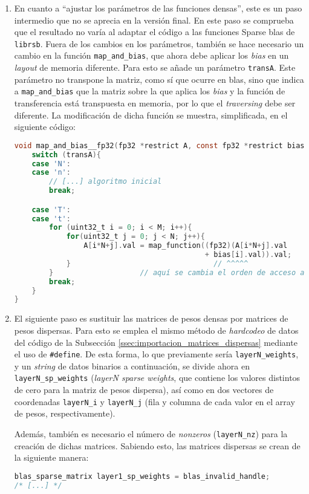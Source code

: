 \begin{enumerate}
    \item En cuanto a ``ajustar los parámetros de las funciones densas'', este es un paso intermedio que no se aprecia en la versión final. En este paso se comprueba que el resultado no varía al adaptar el código a las funciones Sparse \acrshort{blas} de \texttt{librsb}. Fuera de los cambios en los parámetros, también se hace necesario un cambio en la función \texttt{map\_and\_bias}, que ahora debe aplicar los \textit{bias} en un \textit{layout} de memoria diferente. Para esto se añade un parámetro \texttt{transA}. Este parámetro no transpone la matriz, como sí que ocurre en \acrshort{blas}, sino que indica a \texttt{map\_and\_bias} que la matriz sobre la que aplica los \textit{bias} y la función de transferencia está transpuesta en memoria, por lo que el \textit{traversing} debe ser diferente. La modificación de dicha función se muestra, simplificada, en el siguiente código:\medskip
\begin{lstlisting}[language=C]
void map_and_bias__fp32(fp32 *restrict A, const fp32 *restrict bias, const uint32_t M, const uint32_t N, const char transA, fp32 (* map_function)(fp32 x)){
    switch (transA){
    case 'N':
    case 'n':
        // [...] algoritmo inicial
        break;

    case 'T':
    case 't':
        for (uint32_t i = 0; i < M; i++){
            for(uint32_t j = 0; j < N; j++){
                A[i*N+j].val = map_function((fp32)(A[i*N+j].val 
                                            + bias[i].val)).val;
            }                                 // ^^^^^
        }                    // aquí se cambia el orden de acceso a bias
        break;
    }
}
\end{lstlisting}

    \item El siguiente paso es sustituir las matrices de pesos densas por matrices de pesos dispersas. Para esto se emplea el mismo método de \textit{hardcodeo} de datos del código de la Subsección \ref{ssec:importacion_matrices_dispersas} mediante el uso de \texttt{\#define}. De esta forma, lo que previamente sería \texttt{layerN\_weights}, y un \textit{string} de datos binarios a continuación, se divide ahora en \texttt{layerN\_sp\_weights} (\textit{layerN sparse weights}, que contiene los valores distintos de cero para la matriz de pesos dispersa), así como en dos vectores de coordenadas \texttt{layerN\_i} y \texttt{layerN\_j} (fila y columna de cada valor en el array de pesos, respectivamente).
    
    Además, también es necesario el número de \textit{nonzeros} (\texttt{layerN\_nz}) para la creación de dichas matrices. Sabiendo esto, las matrices dispersas se crean de la siguiente manera:\medskip
\begin{lstlisting}[language=C]
blas_sparse_matrix layer1_sp_weights = blas_invalid_handle;
/* [...] */


\end{lstlisting}
\end{enumerate}
